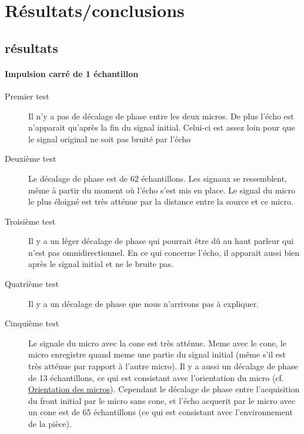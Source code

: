 \documentclass[12pt,a4paper]{report}
\begin{document}
\section{Résultats/conclusions}
\subsection{résultats}
\paragraph{Impulsion carré de 1 échantillon}
\begin{description}
\item[Premier test] Il n'y a pas de décalage de phase entre les deux micros. De plus l'écho est n'apparait qu'après la fin du signal initial. Celui-ci est assez loin pour que le signal original ne soit pas bruité par l'écho
\item[Deuxième test] \label{test1sample1} Le décalage de phase est de 62 échantillons. Les signaux se ressemblent, même à partir du moment où l'écho s'est mis en place. Le signal du micro le plus éloigné est très atténue par la distance entre la source et ce micro.
\item[Troisième test] Il y a un léger décalage de phase qui pourrait être dû au haut parleur qui n'est pas omnidirectionnel. En ce qui concerne l'écho, il apparait aussi bien après le signal initial et ne le bruite pas.
\item[Quatrième test] Il y a un décalage de phase que nous n'arrivons pas à expliquer.
\item[Cinquième test] Le signale du micro avec la cone est très atténue. Meme avec le cone, le micro enregistre quand meme une partie du signal initial (même s'il est très atténue par rapport à l'autre micro). Il y a aussi un décalage de phase de 13 échantillons, ce qui est consistant avec l'orientation du micro (cf. \hyperref[orientation_micro]{Orientation des micros}). Cependant le décalage de phase entre l'acquisition du front initial par le micro sans cone, et l'écho acquerit par le micro avec un cone est de 65 échantillons (ce qui est consistant avec l'environnement de la pièce).
\end{description}
\end{document}
